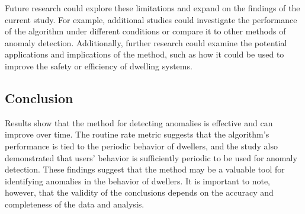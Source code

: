 Future research could explore these limitations and expand on the findings of the current study.
For example, additional studies could investigate the performance of the algorithm under different conditions or compare it to other methods of anomaly detection. 
Additionally, further research could examine the potential applications and implications of the method, such as how it could be used to improve the safety or efficiency of dwelling systems.

\subsection{Conclusion}

Results show that the method for detecting anomalies is effective and can improve over time.
The routine rate metric suggests that the algorithm's performance is tied to the periodic behavior of dwellers,
and the study also demonstrated that users' behavior is sufficiently periodic to be used for anomaly detection.
These findings suggest that the method may be a valuable tool for identifying anomalies in the behavior of dwellers.
It is important to note, however, that the validity of the conclusions depends on the accuracy and completeness of the data and analysis.



